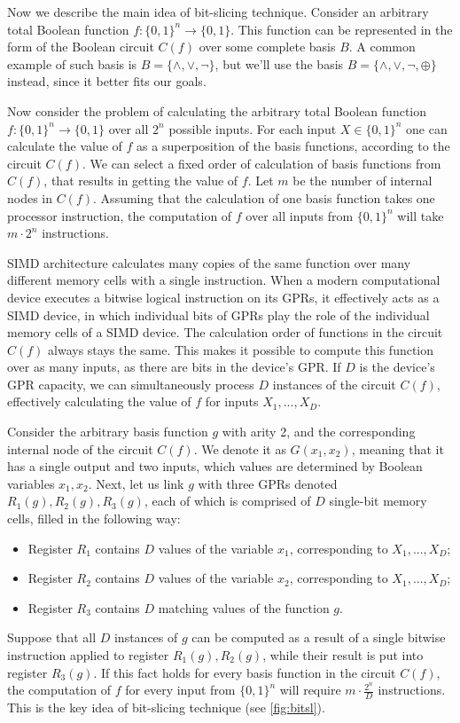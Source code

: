 \documentclass[runningheads,a4paper]{llncs}[2015/06/24]
\begin{document}
Now we describe the main idea of bit-slicing technique. Consider an arbitrary total Boolean function 
$f:\{0,1\}^n\rightarrow\{0,1\}$. This function can be represented in the form of the 
Boolean circuit $C(f)$ over some complete basis $B$. A common example of such basis is
$B=\{\land,\lor,\neg\}$, but we'll use the basis $B=\{\land,\lor,\neg,\oplus\}$
instead, since it better fits our goals.

Now consider the problem of calculating the arbitrary total Boolean function
$f:\{0,1\}^n\rightarrow\{0,1\}$ over all $2^n$ possible inputs. For each input
$X\in\{0,1\}^n$ one can calculate the value of $f$ as a superposition of the
basis functions, according to the circuit $C(f)$. We can select a fixed order of calculation 
of basis functions from $C(f)$, that results in getting the value of $f$. 
Let $m$ be the number of internal nodes in $C(f)$. Assuming that the calculation of one basis function takes one processor
instruction, the computation of $f$ over all inputs from $\{0,1\}^n$ will take
$m\cdot2^n$ instructions.

SIMD architecture calculates many copies of the same function over many different memory cells with a single instruction.
When a modern computational device executes a bitwise logical instruction on its
GPRs, it effectively acts as a SIMD device, in which individual bits of GPRs play the
role of the individual memory cells of a SIMD device. The calculation order of
functions in the circuit $C(f)$ always stays the same. This makes it possible to
compute this function over as many inputs, as there are bits in the device's
GPR.  If $D$ is the device's GPR capacity, we can simultaneously
process $D$ instances of the circuit $C(f)$, effectively calculating the value of
$f$ for inputs $X_1,...,X_D$.

Consider the arbitrary basis function $g$ with arity 2, and the
corresponding internal node of the circuit $C(f)$. We denote it as $G(x_1,x_2)$,
meaning that it has a single output and two inputs, which values are determined
by Boolean variables $x_1,x_2$. Next, let us link $g$ with three GPRs denoted
$R_1(g),R_2(g),R_3(g)$, each of which is comprised of $D$ single-bit memory
cells, filled in the following way: 
\begin{itemize} 
\item Register $R_1$ contains $D$ values of the variable $x_1$, corresponding
 to $X_1,...,X_D$; 
\item Register $R_2$ contains $D$ values of the variable $x_2$, corresponding
 to $X_1,...,X_D$;
\item Register $R_3$ contains $D$ matching values of the function $g$.
\end{itemize}
Suppose that all $D$ instances of $g$ can be computed as a result of a single bitwise
instruction applied to register $R_1(g),R_2(g)$, while their result is put into
register $R_3(g)$.  If this fact holds for every basis function in
the circuit $C(f)$, the computation of $f$ for every input from $\{0,1\}^n$ will
require $m\cdot\frac{2^n}{D}$ instructions. This is the key idea of
bit-slicing technique (see \cref{fig:bitsl}).
\end{document}
